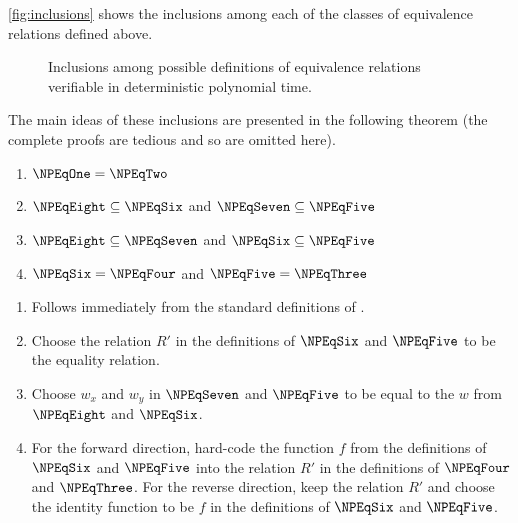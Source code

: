 \autoref{fig:inclusions} shows the inclusions among each of the classes of equivalence relations defined above.
\begin{figure}
  \caption{\label{fig:inclusions}Inclusions among possible definitions of equivalence relations verifiable in deterministic polynomial time.}
  \begin{center}
  \end{center}
\end{figure}
The main ideas of these inclusions are presented in the following theorem (the complete proofs are tedious and so are omitted here).
\begin{theorem}\label{thm:definitions}\mbox{}
  \begin{enumerate}
  \item $\NPEqOne = \NPEqTwo$
  \item $\NPEqEight \subseteq \NPEqSix$ and $\NPEqSeven \subseteq \NPEqFive$
  \item $\NPEqEight \subseteq \NPEqSeven$ and $\NPEqSix \subseteq \NPEqFive$
  \item $\NPEqSix = \NPEqFour$ and $\NPEqFive = \NPEqThree$
  \end{enumerate}
\end{theorem}
\begin{sketch}\mbox{}
  \begin{enumerate}
  \item Follows immediately from the standard definitions of \NP.
  \item Choose the relation $R'$ in the definitions of $\NPEqSix$ and $\NPEqFive$ to be the equality relation.
  \item Choose $w_x$ and $w_y$ in $\NPEqSeven$ and $\NPEqFive$ to be equal to the $w$ from $\NPEqEight$ and $\NPEqSix$.
  \item
    For the forward direction, hard-code the function $f$ from the definitions of $\NPEqSix$ and $\NPEqFive$ into the relation $R'$ in the definitions of $\NPEqFour$ and $\NPEqThree$.
    For the reverse direction, keep the relation $R'$ and choose the identity function to be $f$ in the definitions of $\NPEqSix$ and $\NPEqFive$.
    \qedhere
  \end{enumerate}
\end{sketch}

